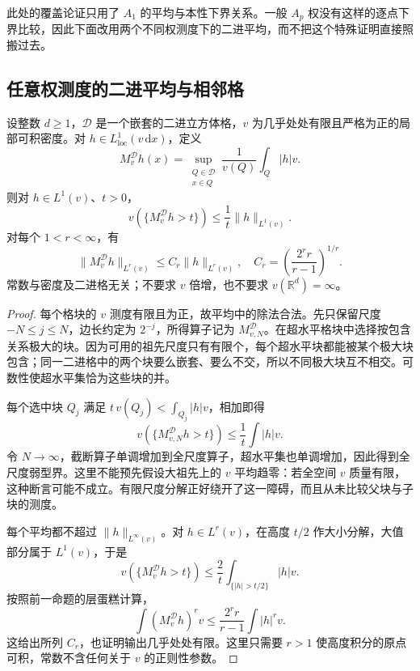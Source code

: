 此处的覆盖论证只用了 \(A_1\) 的平均与本性下界关系。一般 \(A_p\) 权没有这样的逐点下界比较，因此下面改用两个不同权测度下的二进平均，而不把这个特殊证明直接照搬过去。

\subsection{任意权测度的二进平均与相邻格}
\label{b2:subsec:C-weighted-dyadic}

\begin{lemma}[加权二进极大算子]
\label{b2:lem:C-weighted-dyadic-maximal}
设整数 \(d\geq1\)，\(\mathcal D\) 是一个嵌套的二进立方体格，\(v\) 为几乎处处有限且严格为正的局部可积密度。对 \(h\in L^1_{\mathrm{loc}}(v\,\mathrm dx)\)，定义
\[
 M_v^{\mathcal D}h(x)
       =\sup_{\substack{Q\in\mathcal D\\x\in Q}}
          \frac1{v(Q)}\int_Q|h|v.
\]
则对 \(h\in L^1(v)\)、\(t>0\)，
\[
 v(\{M_v^{\mathcal D}h>t\})
       \leq\frac1t\|h\|_{L^1(v)}.
\]
对每个 \(1<r<\infty\)，有
\[
 \|M_v^{\mathcal D}h\|_{L^r(v)}
       \leq C_r\|h\|_{L^r(v)},
 \quad C_r=\left(\frac{2^rr}{r-1}\right)^{1/r}.
\]
常数与密度及二进格无关；不要求 \(v\) 倍增，也不要求
\(v(\mathbb R^d)=\infty\)。
\end{lemma}
\begin{proof}
每个格块的 \(v\) 测度有限且为正，故平均中的除法合法。先只保留尺度
\(-N\leq j\leq N\)，边长约定为 \(2^{-j}\)，所得算子记为
\(M_{v,N}^{\mathcal D}\)。在超水平格块中选择按包含关系极大的块。因为可用的祖先尺度只有有限个，每个超水平块都能被某个极大块包含；同一二进格中的两个块要么嵌套、要么不交，所以不同极大块互不相交。可数性使超水平集恰为这些块的并。

每个选中块 \(Q_j\) 满足
\(t\,v(Q_j)<\int_{Q_j}|h|v\)，相加即得
\[
 v(\{M_{v,N}^{\mathcal D}h>t\})
       \leq\frac1t\int|h|v.
\]
令 \(N\to\infty\)，截断算子单调增加到全尺度算子，超水平集也单调增加，因此得到全尺度弱型界。这里不能预先假设大祖先上的 \(v\) 平均趋零：若全空间 \(v\) 质量有限，这种断言可能不成立。有限尺度分解正好绕开了这一障碍，而且从未比较父块与子块的测度。

每个平均都不超过 \(\|h\|_{L^\infty(v)}\)。对
\(h\in L^r(v)\)，在高度 \(t/2\) 作大小分解，大值部分属于 \(L^1(v)\)，于是
\[
 v(\{M_v^{\mathcal D}h>t\})
       \leq\frac2t\int_{\{|h|>t/2\}}|h|v.
\]
按照前一命题的层蛋糕计算，
\[
 \int(M_v^{\mathcal D}h)^rv
       \leq\frac{2^rr}{r-1}\int|h|^rv.
\]
这给出所列 \(C_r\)，也证明输出几乎处处有限。这里只需要 \(r>1\) 使高度积分的原点可积，常数不含任何关于 \(v\) 的正则性参数。
\end{proof}


